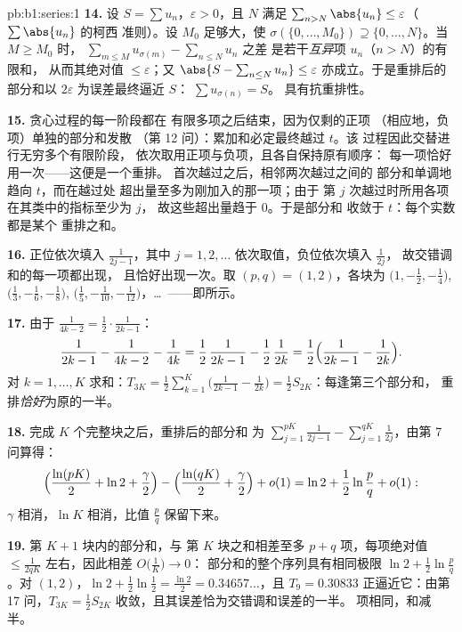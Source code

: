 \begin{solution}{pb:b1:series:1}
\textbf{14.} 设 $S = \sum u_n$，$\varepsilon > 0$，且 $N$ 满足
$\sum_{n > N} \abs{u_n} \leq \varepsilon$（$\sum\abs{u_n}$ 的柯西
准则）。设 $M_0$ 足够大，使 $\sigma(\{0,
\dots, M_0\}) \supseteq \{0, \dots, N\}$。当 $M \geq M_0$ 时，
$\sum_{m \leq M} u_{\sigma(m)} - \sum_{n \leq N} u_n$ 之差
是若干\emph{互异}项 $u_n$（$n > N$）的有限和，
从而其绝对值 $\leq \varepsilon$；又 $\abs{S -
\sum_{n\leq N} u_n} \leq \varepsilon$ 亦成立。于是重排后的
部分和以 $2\varepsilon$ 为误差最终逼近 $S$：
$\sum u_{\sigma(n)} = S$。
具有抗重排性。

\textbf{15.} 贪心过程的每一阶段都在
有限多项之后结束，因为仅剩的正项
（相应地，负项）单独的部分和发散
（第 12 问）：累加和必定最终越过 $t$。该
过程因此交替进行无穷多个有限阶段，
依次取用正项与负项，且各自保持原有顺序：
每一项恰好用一次——这便是一个重排。
首次越过之后，相邻两次越过之间的
部分和单调地趋向 $t$，而在越过处
超出量至多为刚加入的那一项；由于
第 $j$ 次越过时所用各项在其类中的指标至少为 $j$，
故这些超出量趋于 $0$。于是部分和
收敛于 $t$：每个实数都是某个
重排之和。

\textbf{16.} 正位依次填入 $\frac{1}{2j-1}$，其中
$j = 1, 2, \dots$ 依次取值，负位依次填入 $\frac{1}{2j}$，
故交错调和的每一项都出现，
且恰好出现一次。取 $(p, q) = (1, 2)$，各块为
$\bigl(1, -\frac12, -\frac14\bigr)$, $\bigl(\frac13, -\frac16,
-\frac18\bigr)$, $\bigl(\frac15, -\frac1{10},
-\frac1{12}\bigr)$，\dots\ ——即所示。

\textbf{17.} 由于 $\frac{1}{4k-2} = \frac12\cdot\frac{1}{2k-1}$：
\[
\frac{1}{2k-1} - \frac{1}{4k-2} - \frac{1}{4k}
= \frac12\,\frac{1}{2k-1} - \frac12\,\frac{1}{2k}
= \frac12\Bigl(\frac{1}{2k-1} - \frac{1}{2k}\Bigr).
\]
对 $k = 1, \dots, K$ 求和：$T_{3K} = \frac12
\sum_{k=1}^{K}\bigl(\frac{1}{2k-1} - \frac{1}{2k}\bigr) =
\frac12 S_{2K}$：每逢第三个部分和，
重排\emph{恰好}为原的一半。

\textbf{18.} 完成 $K$ 个完整块之后，重排后的部分和
为 $\sum_{j=1}^{pK}\frac{1}{2j-1} -
\sum_{j=1}^{qK}\frac{1}{2j}$，由第 7 问算得：
\[
\Bigl(\frac{\ln(pK)}{2} + \ln 2 + \frac\gamma2\Bigr)
- \Bigl(\frac{\ln(qK)}{2} + \frac\gamma2\Bigr) + o(1)
= \ln 2 + \frac12\ln\frac pq + o(1) :
\]
$\gamma$ 相消，$\ln K$ 相消，比值
$\frac pq$ 保留下来。

\textbf{19.} 第 $K + 1$ 块内的部分和，与
第 $K$ 块之和相差至多 $p + q$ 项，每项绝对值
$\leq \frac{1}{2qK}$ 左右，因此相差 $O\bigl(\frac1K\bigr) \to 0$：
部分和的整个序列具有相同极限 $\ln 2 +
\frac12\ln\frac pq$。对 $(1, 2)$，$\ln 2 + \frac12\ln\frac12 =
\frac{\ln 2}{2} = 0.34657\dots$，且 $T_9 = 0.30833$
正逼近它：由第 17 问，$T_{3K} = \frac12 S_{2K}$
收敛，且其误差恰为交错调和误差的一半。
项相同，和减半。


\end{solution}
